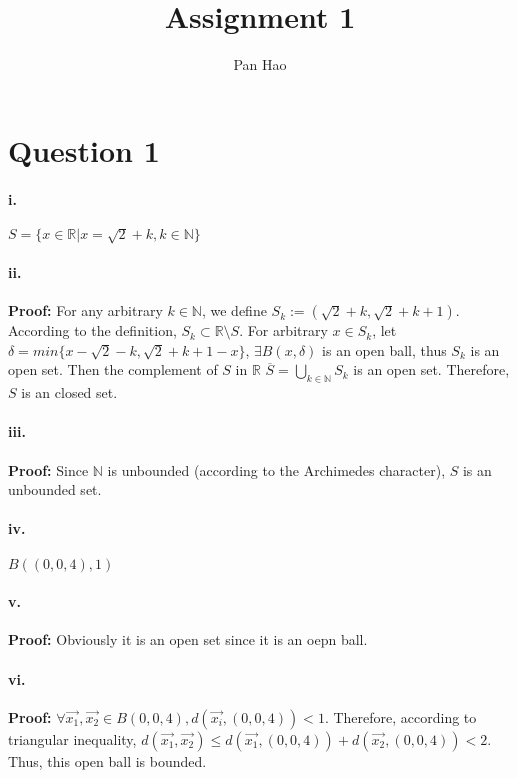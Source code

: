 \documentclass[11pt, a4paper]{article}
\begin{document}
\title{Assignment 1}
\author{Pan Hao}
\date{}
\maketitle
\section*{Question 1} 

\paragraph{i.}
$S = \{x \in \mathbb{R} | x = \sqrt {2} + k, k \in \mathbb{N} \}$ 

\paragraph{ii.}
\textbf{Proof:} For any arbitrary $k\in \mathbb{N}$, we define $S_k := (\sqrt{2} + k, \sqrt{2} + k + 1)$. \\ 
According to the definition, $S_k \subset \mathbb{R} \setminus S$. For arbitrary $x \in S_k$, let $\delta = min\{x- \sqrt{2} - k, \sqrt{2} + k + 1 - x\}$, $\exists B(x, \delta)$ is an open ball, thus $S_k$ is an open set.
Then the complement of $S$ in $\mathbb{R}$ $\overline{S} = \bigcup_{k \in \mathbb{N}} S_k$ is an open set. Therefore, $S$ is an closed set.

\paragraph{iii.}
\textbf{Proof:} Since $\mathbb{N}$ is unbounded (according to the Archimedes character), $S$ is an unbounded set.

\paragraph{iv.}
$B((0, 0, 4), 1)$

\paragraph{v.}
\textbf{Proof:} Obviously it is an open set since it is an oepn ball.

{\color{red} \paragraph{vi.}
\textbf{Proof:} $\forall \vec{x_1}, \vec{x_2} \in B(0, 0, 4), d(\vec{x_i}, (0, 0, 4)) < 1$. Therefore, according to triangular inequality, $d(\vec{x_1}, \vec{x_2}) \leq d(\vec{x_1}, (0, 0, 4)) + d(\vec{x_2}, (0, 0, 4)) < 2$. Thus, this open ball is bounded.}
\end{document}
